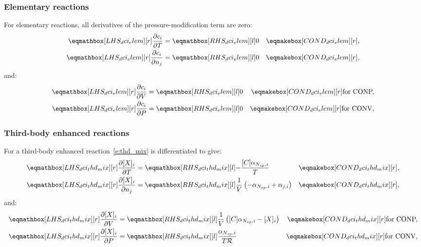 \documentclass[12pt]{article}
\newcommand{\ns}{N_{sp}}
\newcommand{\conp}{CONP}
\newcommand{\conv}{CONV}
\newcommand{\dconp}{\ifmmode\text{for \conp,}\else for \conp,\fi}
\newcommand{\dconv}{\ifmmode\text{for \conv,}\else for \conv.\fi}
\newcommand{\Ru}{\mathcal{R}}
\begin{document}
\subsubsection{Elementary reactions}
For elementary reactions, all derivatives of the pressure-modification term are zero:
\begin{align}
\lhs{dci_elem}{\frac{\partial c_{i} }{\partial T }} &= \rhs{dci_elem}{0} & \cond{dci_elem}{,} \label{e:dci_elem_dt} \\
\lhs{dci_elem}{\frac{\partial c_{i} }{\partial {n_j} }} &= \rhs{dci_elem}{0} & \cond{dci_elem}{,} \label{e:dci_elem_dnj} \\
\end{align}
and:
\begin{subequations}
 \label{e:dci_elem_de}
 \begin{align}
  \lhs{dci_elem}{\frac{\partial c_{i} }{\partial V }} &= \rhs{dci_elem}{0} & \cond{dci_elem}{\dconp} \\
  \lhs{dci_elem}{\frac{\partial c_{i} }{\partial P }} &= \rhs{dci_elem}{0} & \cond{dci_elem}{\dconv}
 \end{align}
\end{subequations}


\subsubsection{Third-body enhanced reactions}
For a third-body enhanced reaction~\cref{e:thd_mix} is differentiated to give:
\begin{align}
 \lhs{dci_thd_mix}{\frac{\partial [X]_i }{\partial T }} &= \rhs{dci_thd_mix}{-\frac{[C] \alpha_{\ns,i}}{T}} & \cond{dci_thd_mix}{,} \label{e:dci_thd_dt} \\
 \lhs{dci_thd_mix}{\frac{\partial [X]_i }{\partial n_{j}}} &= \rhs{dci_thd_mix}{\frac{1}{V} \left(- \alpha_{\ns,i} + \alpha_{j,i}\right)} & \cond{dci_thd_mix}{,} \label{e:dci_thd_dnj}
\end{align}
and:
\begin{subequations}
 \label{e:dci_thd_de}
 \begin{align}
  \lhs{dci_thd_mix}{\frac{\partial [X]_i }{\partial V }} &= \rhs{dci_thd_mix}{\frac{1}{V} \left([C] \alpha_{\ns,i} - [X]_{i}\right)} & \cond{dci_thd_mix}{\dconp}\\
  \lhs{dci_thd_mix}{\frac{\partial [X]_i }{\partial P }} &= \rhs{dci_thd_mix}{\frac{\alpha_{\ns,i}}{T \Ru}} & \cond{dci_thd_mix}{\dconv}
 \end{align}
\end{subequations}
\end{document}
